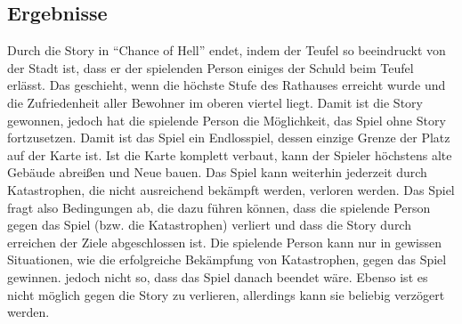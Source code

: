 \documentclass[paper=A4,pagesize=auto,12pt,headinclude=true,footinclude=true,BCOR=0mm,DIV=calc]{scrartcl}
\newcommand{\sectionspace}{
	\vspace{0.5cm}
}
\newcommand{\gametitle}{Chance of Hell}
\begin{document}
\subsection{Ergebnisse}\label{sec:Ergebnisse}
Durch die Story in ``\gametitle'' endet, indem der Teufel so beeindruckt von der Stadt ist, dass er der spielenden Person einiges der Schuld beim Teufel erlässt. Das geschieht, wenn die höchste Stufe des Rathauses erreicht wurde und die Zufriedenheit aller Bewohner im oberen viertel liegt. Damit ist die Story gewonnen, jedoch hat die spielende Person die Möglichkeit, das Spiel ohne Story fortzusetzen. Damit ist das Spiel ein Endlosspiel, dessen einzige Grenze der Platz auf der Karte ist. Ist die Karte komplett verbaut, kann der Spieler höchstens alte Gebäude abreißen und Neue bauen. Das Spiel kann weiterhin jederzeit durch Katastrophen, die nicht ausreichend bekämpft werden, verloren werden.
Das Spiel fragt also Bedingungen ab, die dazu führen können, dass die spielende Person gegen das Spiel (bzw. die Katastrophen) verliert und dass die Story durch erreichen der Ziele abgeschlossen ist. Die spielende Person kann nur in gewissen Situationen, wie die erfolgreiche Bekämpfung von Katastrophen, gegen das Spiel gewinnen. jedoch nicht so, dass das Spiel danach beendet wäre. Ebenso ist es nicht möglich gegen die Story zu verlieren, allerdings kann sie beliebig verzögert werden.


\sectionspace
\newpage
\printbibliography[heading=bibnumbered, title=Referenzen]\label{sec:Referenzen}
\end{document}
